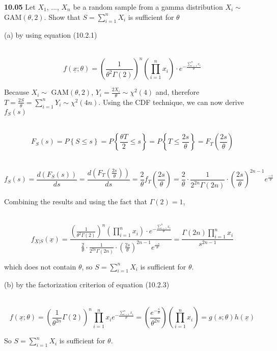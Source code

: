 { \bf 10.05 }Let $ X_{1} $, ..., $ X_{n} $ be a random sample from a gamma distribution $ X_{i} \sim $ GAM$ (\theta,2) $. Show that $ S=\sum_{i=1}^{n}X_{i} $ is sufficient for $ \theta $

(a) by using equation (10.2.1)

\ $$  f(\underline{x}; \theta )=  \left (\frac{1}{\theta^{2}\Gamma(2)} \right )^{n} (\prod_{i=1}^{n}x_{i}) \cdot e^{-\frac{\sum_{i=1}^{n}x_{i}}{\theta}}  $$

Because $ X_{i} \sim $ GAM$ (\theta,2) $, $Y_{i}=\frac{2X_{i}}{\theta} \sim \chi^{2}(4) $ and, therefore $ T=\frac{2S}{\theta}= \sum_{i=1}^{n}Y_{i} \sim \chi^{2}(4n) $.  Using the CDF technique, we can now derive $ f_{S}(s) $

\ $$ F_{S}(s)=P \left\{S \leq s \right\}= P \left\{ \frac{\theta T}{2} \leq s \right\}= P \left\{T \leq \frac{2s}{\theta} \right\}= F_{T}\left(\frac{2s}{\theta}\right) $$

\ $$ f_{S}(s)=\frac{d(F_{S}(s))}{ds}=\frac{d(F_{T}(\frac{2s}{\theta}))}{ds}=\frac{2}{\theta}f_{T}(\frac{2s}{\theta})=\frac{2}{\theta} \cdot \frac{1}{2^{2n}\Gamma(2n)} \cdot \left (\frac{2s}{\theta} \right )^{2n-1} e^{\frac{-s}{\theta}} $$

Combining the results and using the fact that $ \Gamma(2)=1 $,

\ $$ f_{\underline{X}|S}(\underline{x})= \frac {\left (\frac{1}{\theta^{2}\Gamma(2)} \right )^{n} (\prod_{i=1}^{n}x_{i}) \cdot e^{-\frac{\sum_{i=1}^{n}x_{i}}{\theta}}}{\frac{2}{\theta} \cdot \frac{1}{2^{2n}\Gamma(2n)} \cdot \left (\frac{2s}{\theta} \right )^{2n-1} e^{\frac{-s}{\theta}}}= \frac{\Gamma(2n) \prod_{i=1}^{n}x_{i}}{s^{2n-1}} $$

which does not contain $ \theta $, so $ S=\sum_{i=1}^{n}X_{i} $ is sufficient for $ \theta $.



(b) by the factorization criterion of equation (10.2.3)

\ $$  f(\underline{x}; \theta )=  \left ( \frac{1}{\theta^{2n}} \Gamma(2) \right )^{n}\prod_{i=1}^{n}x_{i}e^{-\frac{\sum_{i=1}^{n}x_{i}}{\theta}}= \left ( \frac{e^{-\frac{s}{\theta}}}{\theta^{2n}} \right) (\prod_{i=1}^{n}x_{i})= g(s;\theta) h( \underline{x}) $$

So $ S=\sum_{i=1}^{n}X_{i} $ is sufficient for $ \theta $.
